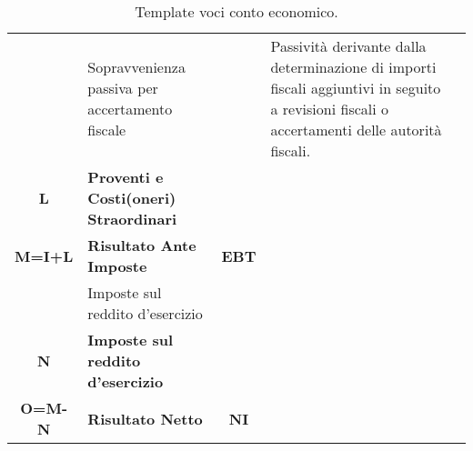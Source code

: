 \documentclass{book}
\newcommand{\SopravvenienzaPassivaAccertamentoFiscale}{Passività derivante dalla determinazione di importi fiscali aggiuntivi in seguito a revisioni fiscali o accertamenti delle autorità fiscali.}
\begin{document}
\begin{table}[ht]
{\begin{tabular}{|c l|c|l|c|}
& Sopravvenienza passiva per accertamento fiscale & & \SopravvenienzaPassivaAccertamentoFiscale & \\
\textbf{L} & \textbf{Proventi e Costi(oneri) Straordinari} & & & \\
\hline
\textbf{M=I+L} & \textbf{Risultato Ante Imposte} & \textbf{EBT} & & \\
\hline
& Imposte sul reddito d'esercizio & & & \\
\textbf{N} & \textbf{Imposte sul reddito d'esercizio} & & & \\
\hline
\textbf{O=M-N} & \textbf{Risultato Netto} & \textbf{NI} & & \\
\hline
\end{tabular}
}
\caption{Template voci conto economico.}
\end{table}

\newpage
\end{document}
